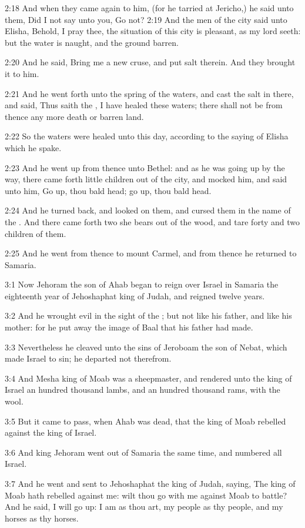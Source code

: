 2:18 And when they came again to him, (for he tarried at Jericho,) he said unto them, Did I not say unto you, Go not?  2:19 And the men of the city said unto Elisha, Behold, I pray thee, the situation of this city is pleasant, as my lord seeth: but the water is naught, and the ground barren.

2:20 And he said, Bring me a new cruse, and put salt therein. And they brought it to him.

2:21 And he went forth unto the spring of the waters, and cast the salt in there, and said, Thus saith the \LORD, I have healed these waters; there shall not be from thence any more death or barren land.

2:22 So the waters were healed unto this day, according to the saying of Elisha which he spake.

2:23 And he went up from thence unto Bethel: and as he was going up by the way, there came forth little children out of the city, and mocked him, and said unto him, Go up, thou bald head; go up, thou bald head.

2:24 And he turned back, and looked on them, and cursed them in the name of the \LORD. And there came forth two she bears out of the wood, and tare forty and two children of them.

2:25 And he went from thence to mount Carmel, and from thence he returned to Samaria.

3:1 Now Jehoram the son of Ahab began to reign over Israel in Samaria the eighteenth year of Jehoshaphat king of Judah, and reigned twelve years.

3:2 And he wrought evil in the sight of the \LORD; but not like his father, and like his mother: for he put away the image of Baal that his father had made.

3:3 Nevertheless he cleaved unto the sins of Jeroboam the son of Nebat, which made Israel to sin; he departed not therefrom.

3:4 And Mesha king of Moab was a sheepmaster, and rendered unto the king of Israel an hundred thousand lambs, and an hundred thousand rams, with the wool.

3:5 But it came to pass, when Ahab was dead, that the king of Moab rebelled against the king of Israel.

3:6 And king Jehoram went out of Samaria the same time, and numbered all Israel.

3:7 And he went and sent to Jehoshaphat the king of Judah, saying, The king of Moab hath rebelled against me: wilt thou go with me against Moab to battle? And he said, I will go up: I am as thou art, my people as thy people, and my horses as thy horses.

